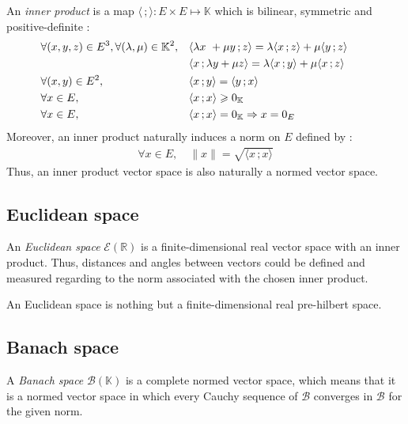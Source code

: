 An \emph{inner product} is a map $\langle \,; \rangle : E \times E \longmapsto \mathbb{K}$ which is bilinear, symmetric and positive-definite :
\begin{subequations}
\begin{align}
	&\forall (x,y,z) \in E^3, \forall (\lambda,\mu) \in \mathbb{K}^2, 	&& \langle \lambda x\ + \mu y \,; z\rangle  = \lambda \langle  x \,; z\rangle + \mu \langle  y\,; z\rangle&&&\\
	&												&& \langle x \,; \lambda y + \mu z \rangle  = \lambda \langle  x\,; y\rangle + \mu \langle  x \,; z\rangle&&&\notag\\
	&\forall (x,y) \in E^2, 									&& \langle x\,; y\rangle = \langle y\,; x\rangle &&&\\
	&\forall x \in E, 										&& \langle x\,; x\rangle \geqslant 0_\mathbb{K} &&&\\
	&\forall x \in E, 										&& \langle x\,; x\rangle = 0_\mathbb{K} \Rightarrow x = 0_E &&&
\end{align}
\end{subequations}
Moreover, an inner product naturally induces a norm on $E$ defined by :
\begin{align}
	\forall x \in E, \quad \|x\| = \sqrt{\langle x\,; x\rangle}
\end{align}
Thus, an inner product vector space is also naturally a normed vector space.

\subsection{Euclidean space}
An \emph{Euclidean space} $\mathcal{E}(\mathbb{R})$ is a finite-dimensional real vector space with an inner product.
Thus, distances and angles between vectors could be defined and measured regarding to the norm associated with the chosen inner product.

An Euclidean space is nothing but a finite-dimensional real pre-hilbert space.

\subsection{Banach space}

A \emph{Banach space} $\mathcal{B}(\mathbb{K})$ is a complete normed vector space, which means that it is a normed vector space in which every Cauchy sequence of $\mathcal{B}$ converges in $\mathcal{B}$ for the given norm.

